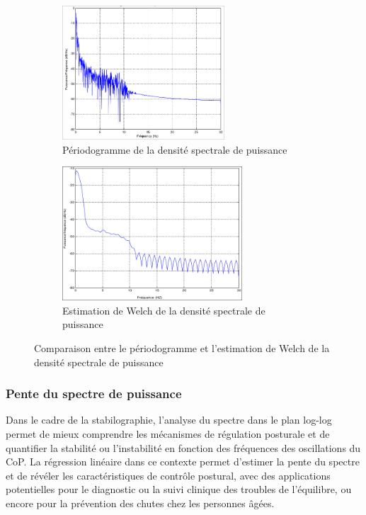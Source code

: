 \begin{figure}[H]
    \centering
    \begin{subfigure}[b]{0.45\textwidth}
        \centering
        \includegraphics[height=5cm]{images/methode/periodogramme.png}
        \caption{Périodogramme de la densité spectrale de puissance}\label{fig:periodogramme}
    \end{subfigure}
    \begin{subfigure}[b]{0.45\textwidth}
        \centering
        \includegraphics[height=5cm]{images/methode/welch.png}
        \caption{Estimation de Welch de la densité spectrale de puissance}\label{fig:welch}
    \end{subfigure}
    \caption{Comparaison entre le périodogramme et l'estimation de Welch de la densité spectrale de puissance}\label{fig:periodogramme_welch}
\end{figure}

\subsubsection{Pente du spectre de puissance}

Dans le cadre de la stabilographie, l’analyse du spectre dans le plan log-log permet de mieux comprendre les mécanismes de régulation posturale et de quantifier la stabilité ou l’instabilité en fonction des
fréquences des oscillations du CoP. La régression linéaire dans ce contexte permet d’estimer la pente du
spectre et de révéler les caractéristiques de contrôle postural, avec des applications potentielles pour le
diagnostic ou la suivi clinique des troubles de l’équilibre, ou encore pour la prévention des chutes chez
les personnes âgées.

